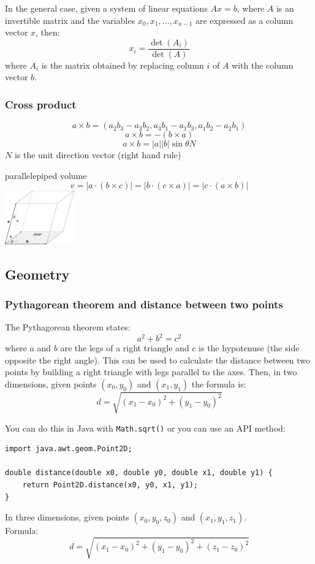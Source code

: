 \documentclass[a4paper,12pt]{article}
\begin{document}
\noindent In the general case, given a system of linear equations $Ax=b$, where $A$ is an invertible matrix and the variables $x_0,x_1,\ldots,x_{n-1}$ are expressed as a column vector $x$, then:
\[x_i=\frac{\det(A_i)}{\det(A)}\]
\noindent where $A_i$ is the matrix obtained by replacing column $i$ of $A$ with the column vector $b$.

\subsubsection{Cross product}
\[a \times b = (a_2b_3 - a_3b_2, a_3b_1 - a_1b_3, a_1b_2 - a_2b_1)\]
\[a \times b = -(b \times a)\]
\[a \times b = |a||b|\sin\theta N\]
$N$ is the unit direction vector (right hand rule)

parallelepiped volume
\[v = |a \cdot (b \times c)| = |b \cdot (c \times a)| = |c \cdot (a \times b)|\]
\includegraphics[width=30mm]{pp_vol.pdf}

\subsection{Geometry}
\subsubsection{Pythagorean theorem and distance between two points}
\noindent The Pythagorean theorem states:
\[a^2+b^2=c^2\]
\noindent where $a$ and $b$ are the legs of a right triangle and $c$ is the hypotenuse (the side opposite the right angle). This can be used to calculate the distance between two points by building a right triangle with legs parallel to the axes. Then, in two dimensions, given points $(x_0, y_0)$ and $(x_1, y_1)$ the formula is:
\[ d = \sqrt{(x_1 - x_0)^2 + (y_1 - y_0)^2} \]

\noindent You can do this in Java with \lstinline/Math.sqrt()/ or you can use an API method:
\begin{lstlisting}
import java.awt.geom.Point2D;

double distance(double x0, double y0, double x1, double y1) {
	return Point2D.distance(x0, y0, x1, y1);
}
\end{lstlisting}

\noindent In three dimensions, given points $(x_0, y_0, z_0)$ and $(x_1, y_1, z_1)$. \\ Formula:
\[ d = \sqrt{(x_1 - x_0)^2 + (y_1 - y_0)^2 + (z_1 - z_0)^2} \]
\end{document}
